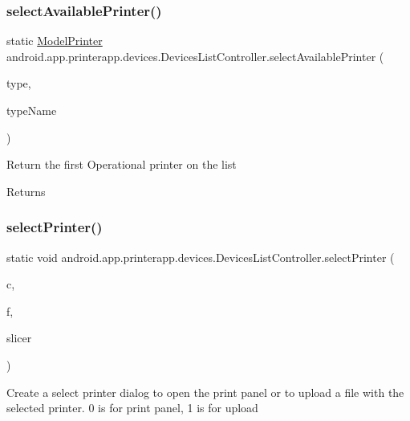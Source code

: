 \subsubsection{\texorpdfstring{select\+Available\+Printer()}{selectAvailablePrinter()}}
{\footnotesize\ttfamily static \hyperlink{classandroid_1_1app_1_1printerapp_1_1model_1_1_model_printer}{Model\+Printer} android.\+app.\+printerapp.\+devices.\+Devices\+List\+Controller.\+select\+Available\+Printer (\begin{DoxyParamCaption}\item[{int}]{type,  }\item[{String}]{type\+Name }\end{DoxyParamCaption})\hspace{0.3cm}{\ttfamily [static]}}

Return the first Operational printer on the list

\begin{DoxyReturn}{Returns}

\end{DoxyReturn}
\mbox{\label{classandroid_1_1app_1_1printerapp_1_1devices_1_1_devices_list_controller_a569eb18602c84ff12b1fcb152a3ad0cf}} 
\subsubsection{\texorpdfstring{select\+Printer()}{selectPrinter()}}
{\footnotesize\ttfamily static void android.\+app.\+printerapp.\+devices.\+Devices\+List\+Controller.\+select\+Printer (\begin{DoxyParamCaption}\item[{Context}]{c,  }\item[{File}]{f,  }\item[{final \hyperlink{classandroid_1_1app_1_1printerapp_1_1viewer_1_1_slicing_handler}{Slicing\+Handler}}]{slicer }\end{DoxyParamCaption})\hspace{0.3cm}{\ttfamily [static]}}

Create a select printer dialog to open the print panel or to upload a file with the selected printer. 0 is for print panel, 1 is for upload


